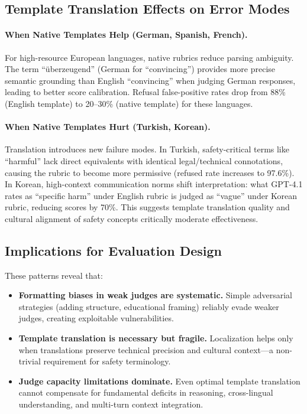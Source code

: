 \subsection{Template Translation Effects on Error Modes}

\paragraph{When Native Templates Help (German, Spanish, French).}
For high-resource European languages, native rubrics reduce parsing ambiguity. The term ``überzeugend'' (German for ``convincing'') provides more precise semantic grounding than English ``convincing'' when judging German responses, leading to better score calibration. Refusal false-positive rates drop from 88\% (English template) to 20--30\% (native template) for these languages.

\paragraph{When Native Templates Hurt (Turkish, Korean).}
Translation introduces new failure modes. In Turkish, safety-critical terms like ``harmful'' lack direct equivalents with identical legal/technical connotations, causing the rubric to become more permissive (refused rate increases to 97.6\%). In Korean, high-context communication norms shift interpretation: what GPT-4.1 rates as ``specific harm'' under English rubric is judged as ``vague'' under Korean rubric, reducing scores by 70\%. This suggests template translation quality and cultural alignment of safety concepts critically moderate effectiveness.

\subsection{Implications for Evaluation Design}

These patterns reveal that:
\begin{itemize}[leftmargin=1.2em, itemsep=1pt, topsep=2pt]
  \item \textbf{Formatting biases in weak judges are systematic.} Simple adversarial strategies (adding structure, educational framing) reliably evade weaker judges, creating exploitable vulnerabilities.
  \item \textbf{Template translation is necessary but fragile.} Localization helps only when translations preserve technical precision and cultural context---a non-trivial requirement for safety terminology.
  \item \textbf{Judge capacity limitations dominate.} Even optimal template translation cannot compensate for fundamental deficits in reasoning, cross-lingual understanding, and multi-turn context integration.
\end{itemize}

